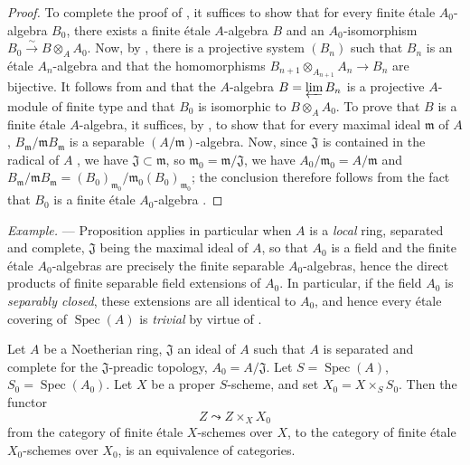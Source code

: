 \begin{proof}
To complete the proof of , it suffices to show that for every finite \'etale $A_0$-algebra $B_0$, there exists a finite \'etale $A$-algebra $B$ and an $A_0$-isomorphism $B_0\xrightarrow{\sim}B\otimes_A A_0$.
Now, by , there is a projective system $(B_n)$ such that $B_n$ is an \'etale $A_n$-algebra and that the homomorphisms $B_{n+1}\otimes_{A_{n+1}}A_n\to B_n$ are bijective.
It follows from  and  that the $A$-algebra $B=\varprojlim B_n$ is a projective $A$-module of finite type and that $B_0$ is isomorphic to $B\otimes_A A_0$.
To prove that $B$ is a finite \'etale $A$-algebra, it suffices, by , to show that for every maximal ideal $\mathfrak{m}$ of $A$, $B_\mathfrak{m}/\mathfrak{m}B_\mathfrak{m}$ is a separable $(A/\mathfrak{m})$-algebra.
Now, since $\mathfrak{J}$ is contained in the radical of $A$ ,
we have $\mathfrak{J}\subset\mathfrak{m}$, so $\mathfrak{m}_0=\mathfrak{m}/\mathfrak{J}$, we have $A_0/\mathfrak{m}_0=A/\mathfrak{m}$ and $B_\mathfrak{m}/\mathfrak{m}B_\mathfrak{m}=(B_0)_{\mathfrak{m}_0}/\mathfrak{m}_0(B_0)_{\mathfrak{m}_0}$;
the conclusion therefore follows from the fact that $B_0$ is a finite \'etale $A_0$-algebra .
\end{proof}

\begin{env}[18.3.3]
\label{IV.18.3.3}
\emph{Example.} ---
Proposition  applies in particular when $A$ is a \emph{local} ring, separated and complete, $\mathfrak{J}$ being the maximal ideal of $A$, so that $A_0$ is a field and the finite \'etale $A_0$-algebras are precisely the finite separable $A_0$-algebras, hence the direct products of finite separable field extensions of $A_0$.
In particular, if the field $A_0$ is \emph{separably closed}, these extensions are all identical to $A_0$, and hence every \'etale covering of $\operatorname{Spec}(A)$ is \emph{trivial}  by virtue of .
\end{env}

\begin{theorem}[18.3.4]
\label{IV.18.3.4}
Let $A$ be a Noetherian ring, $\mathfrak{J}$ an ideal of $A$ such that $A$ is separated and complete for the $\mathfrak{J}$-preadic topology, $A_0=A/\mathfrak{J}$.
Let $S=\operatorname{Spec}(A)$, $S_0=\operatorname{Spec}(A_0)$.
Let $X$ be a proper $S$-scheme, and set $X_0=X\times_S S_0$.
Then the functor
\[
Z\leadsto Z\times_X X_0
\]
from the category of finite \'etale $X$-schemes over $X$, to the category of finite \'etale $X_0$-schemes over $X_0$, is an equivalence of categories.
\end{theorem}

